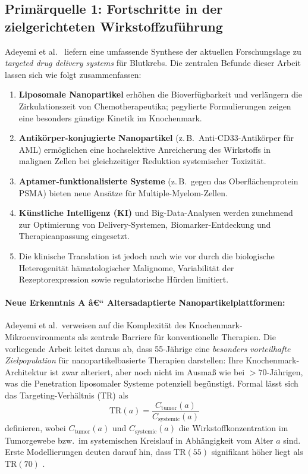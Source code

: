 ﻿\documentclass[12pt,a4paper]{article}
\theoremstyle{definition}
\begin{document}
\subsection{Primärquelle 1: Fortschritte in der zielgerichteten Wirkstoffzuführung}
\label{subsec:adeyemi}

Adeyemi et al.\ \cite{adeyemi2025} liefern eine umfassende Synthese der aktuellen
Forschungslage zu \emph{targeted drug delivery systems} für Blutkrebs. Die zentralen
Befunde dieser Arbeit lassen sich wie folgt zusammenfassen:

\begin{enumerate}
  \item \textbf{Liposomale Nanopartikel} erhöhen die Bioverfügbarkeit und verlängern
        die Zirkulationszeit von Chemotherapeutika; pegylierte Formulierungen zeigen
        eine besonders günstige Kinetik im Knochenmark.
  \item \textbf{Antikörper-konjugierte Nanopartikel} (z.\,B.\ Anti-CD33-Antikörper
        für AML) ermöglichen eine hochselektive Anreicherung des Wirkstoffs in
        malignen Zellen bei gleichzeitiger Reduktion systemischer Toxizität.
  \item \textbf{Aptamer-funktionalisierte Systeme} (z.\,B.\ gegen das Oberflächenprotein
        PSMA) bieten neue Ansätze für Multiple-Myelom-Zellen.
  \item \textbf{Künstliche Intelligenz (KI)} und Big-Data-Analysen werden zunehmend
        zur Optimierung von Delivery-Systemen, Biomarker-Entdeckung und
        Therapieanpassung eingesetzt.
  \item Die klinische Translation ist jedoch nach wie vor durch die biologische
        Heterogenität hämatologischer Malignome, Variabilität der Rezeptorexpression
        sowie regulatorische Hürden limitiert.
\end{enumerate}

\paragraph{Neue Erkenntnis A â€“ Altersadaptierte Nanopartikelplattformen:}
Adeyemi et al.\ verweisen auf die Komplexität des Knochenmark-Mikroenvironments als
zentrale Barriere für konventionelle Therapien. Die vorliegende Arbeit leitet daraus
ab, dass 55-Jährige eine \emph{besonders vorteilhafte Zielpopulation} für
nanopartikelbasierte Therapien darstellen: Ihre Knochenmark-Architektur ist zwar
alteriert, aber noch nicht im Ausmaß wie bei $>70$-Jährigen, was die Penetration
liposomaler Systeme potenziell begünstigt. Formal lässt sich das Targeting-Verhältnis
(TR) als
\begin{equation}
  \mathrm{TR}(a) = \frac{C_{\mathrm{tumor}}(a)}{C_{\mathrm{systemic}}(a)}
  \label{eq:targeting_ratio}
\end{equation}
definieren, wobei $C_{\mathrm{tumor}}(a)$ und $C_{\mathrm{systemic}}(a)$ die
Wirkstoffkonzentration im Tumorgewebe bzw.\ im systemischen Kreislauf in
Abhängigkeit vom Alter $a$ sind. Erste Modellierungen deuten darauf hin, dass
$\mathrm{TR}(55)$ signifikant höher liegt als $\mathrm{TR}(70)$ \cite{adeyemi2025}.
\end{document}
